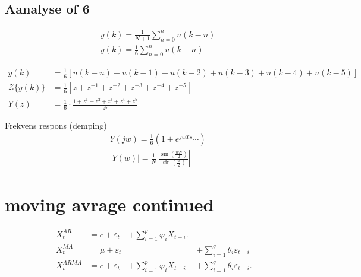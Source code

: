 \documentclass[a4paper,12pt]{article}
\begin{document}
\subsection{Aanalyse of 6}
\label{sec:org93c018a}
\begin{equation}
\begin{aligned}
&y(k)=\frac{1}{N+1} \sum_{n=0}^{n} u(k-n)\\
&y(k)=\frac{1}{6} \sum_{n=0}^{n} u(k-n)
\end{aligned}
\end{equation}

\begin{equation}
\begin{aligned}
y(k) &=\frac{1}{6}[u(k-n)+u(k-1)+u(k-2)+u(k-3)+u(k-4)+u(k-5)] \\
\mathcal{Z}\{y(k)\} &=\frac{1}{6}\left[z+z^{-1}+z^{-2}+z^{-3}+z^{-4}+z^{-5}\right] \\
Y(z) &=\frac{1}{6} \cdot \frac{1+z^{1}+z^{2}+z^{3}+z^{4}+z^{5}}{z^{5}}
\end{aligned}
\end{equation}


Frekvens respons (demping)
\begin{equation}
\begin{aligned}
&Y(j w)=\frac{1}{6}\left(1+e^{j w T s} \cdots\right)\\
&|Y(w)|=\frac{1}{N}\left|\frac{\sin \left(\frac{w N}{2}\right)}{\sin \left(\frac{w}{2}\right)}\right|
\end{aligned}
\end{equation}



\section{moving avrage   continued}
\label{sec:org2810046}

\begin{align}
X^{AR}_{t}&=c  + \varepsilon _{t}      &+ \sum _{i=1}^{p}\varphi _{i}X_{t-i} .\,                 &                                                 \\
X^{MA}_{t}&=\mu + \varepsilon _{t}     &                                                         &+ \sum_{i=1}^{q}\theta _{i}\varepsilon _{t-i}\,  \\
X^{ARMA}_{t}&=  c+\varepsilon _{t}     &+ \sum _{i=1}^{p}\varphi _{i}X_{t-i}                     &+ \sum_{i=1}^{q}\theta _{i}\varepsilon_{t-i}.\,  
\end{align}
\end{document}
